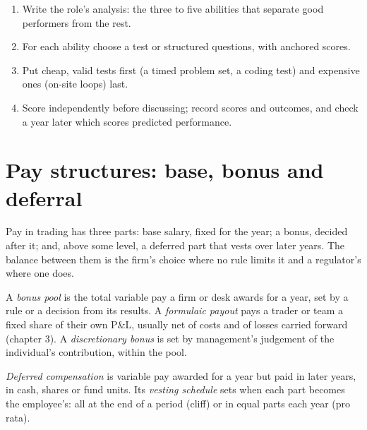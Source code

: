 \begin{method}\label{met:fm:hiring-and-compensation:loop}
\begin{enumerate}
\item Write the role's analysis: the three to five abilities that separate good performers from the rest.
\item For each ability choose a test or structured questions, with anchored scores.
\item Put cheap, valid tests first (a timed problem set, a coding test) and expensive ones (on-site loops) last.
\item Score independently before discussing; record scores and outcomes, and check a year later which scores predicted performance.
\end{enumerate}
\end{method}

\section{Pay structures: base, bonus and deferral}

Pay in trading has three parts: base salary, fixed for the year; a bonus, decided after it; and, above some level, a deferred part that vests
over later years. The balance between them is the firm's choice where no rule limits it and a regulator's where one does.

\begin{definition}\label{def:fm:hiring-and-compensation:pool}
A \emph{bonus pool} is the total variable pay a firm or desk awards for a year, set by a rule or a decision from its results.
A \emph{formulaic payout} pays a trader or team a fixed share of their own P\&L, usually net of costs and of losses
carried forward (chapter 3). A \emph{discretionary bonus} is set by management's judgement of the individual's
contribution, within the pool.
\end{definition}

\begin{definition}\label{def:fm:hiring-and-compensation:deferral}
\emph{Deferred compensation} is variable pay awarded for a year but paid in later years, in cash, shares or fund
units. Its \emph{vesting schedule} sets when each part becomes the employee's: all at the end of a period (cliff) or in
equal parts each year (pro rata).
\end{definition}

